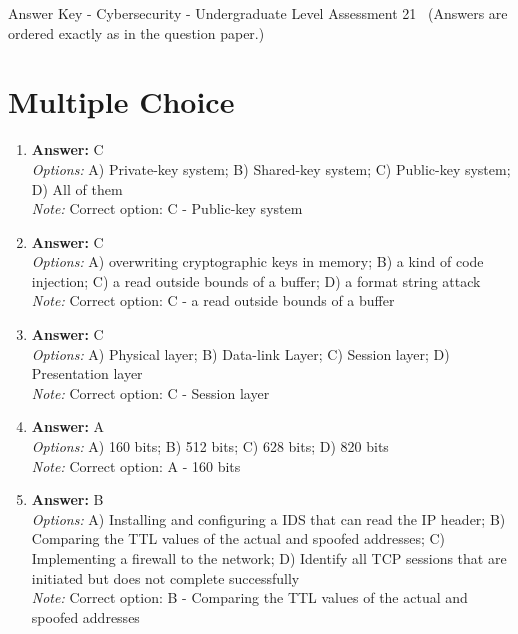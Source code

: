 \documentclass[12pt]{article}
\begin{document}
\begin{center}
Answer Key - Cybersecurity - Undergraduate Level Assessment 21 \
\small (Answers are ordered exactly as in the question paper.)
\end{center}

\section*{Multiple Choice}
\begin{enumerate}[label=\arabic*.]
\item \textbf{Answer:} C
\\ \textit{Options:} A) Private-key system; B) Shared-key system; C) Public-key system; D) All of them
\\ \textit{Note:} Correct option: C - Public-key system
\item \textbf{Answer:} C
\\ \textit{Options:} A) overwriting cryptographic keys in memory; B) a kind of code injection; C) a read outside bounds of a buffer; D) a format string attack
\\ \textit{Note:} Correct option: C - a read outside bounds of a buffer
\item \textbf{Answer:} C
\\ \textit{Options:} A) Physical layer; B) Data-link Layer; C) Session layer; D) Presentation layer
\\ \textit{Note:} Correct option: C - Session layer
\item \textbf{Answer:} A
\\ \textit{Options:} A) 160 bits; B) 512 bits; C) 628 bits; D) 820 bits
\\ \textit{Note:} Correct option: A - 160 bits
\item \textbf{Answer:} B
\\ \textit{Options:} A) Installing and configuring a IDS that can read the IP header; B) Comparing the TTL values of the actual and spoofed addresses; C) Implementing a firewall to the network; D) Identify all TCP sessions that are initiated but does not complete successfully
\\ \textit{Note:} Correct option: B - Comparing the TTL values of the actual and spoofed addresses
\end{enumerate}
\end{document}
